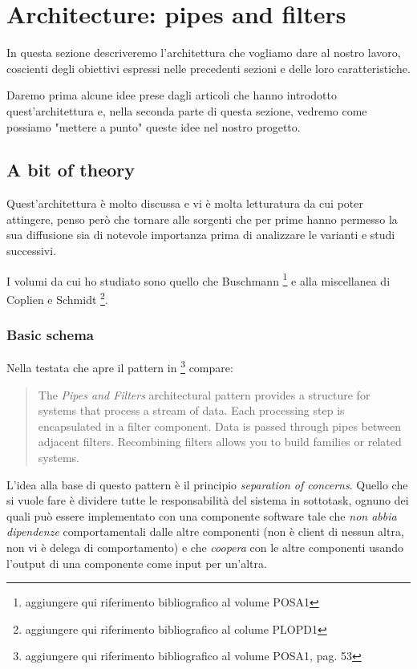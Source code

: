 \section{Architecture: pipes and filters}

In questa sezione descriveremo l'architettura che vogliamo dare al
nostro lavoro, coscienti degli obiettivi espressi nelle precedenti
sezioni e delle loro caratteristiche.

Daremo prima alcune idee prese dagli articoli che hanno introdotto
quest'architettura e, nella seconda parte di questa sezione, vedremo
come possiamo "mettere a punto" queste idee nel nostro progetto.

\subsection{A bit of theory}
Quest'architettura \`e molto discussa e vi \`e molta letturatura da
cui poter attingere, penso per\`o che tornare alle sorgenti che per
prime hanno permesso la sua diffusione sia di notevole importanza
prima di analizzare le varianti e studi successivi. 

I volumi da cui ho studiato sono quello che Buschmann
\footnote{aggiungere qui riferimento bibliografico al volume POSA1} e
alla miscellanea di Coplien e Schmidt \footnote{aggiungere qui
  riferimento bibliografico al colume PLOPD1}.

\subsubsection{Basic schema}
Nella testata che apre il pattern in \footnote{aggiungere qui
  riferimento bibliografico al volume POSA1, pag. 53} compare:
\begin{quotation}
  The \emph{Pipes and Filters} architectural pattern provides a
  structure for systems that process a stream of data. Each processing
  step is encapsulated in a filter component. Data is passed through
  pipes between adjacent filters. Recombining filters allows you to
  build families or related systems.
\end{quotation}
L'idea alla base di questo pattern \`e il principio \emph{separation
  of concerns}. Quello che si vuole fare \`e dividere tutte le
responsabilit\`a del sistema in sottotask, ognuno dei quali pu\`o
essere implementato con una componente software tale che \emph{non
  abbia dipendenze} comportamentali dalle altre componenti (non \`e
client di nessun altra, non vi \`e delega di comportamento) e che
\emph{coopera} con le altre componenti usando l'output di una
componente come input per un'altra.

